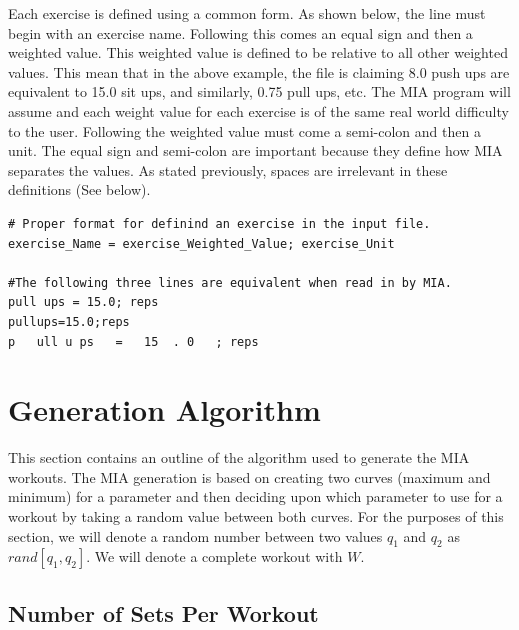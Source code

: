 Each exercise is defined using a common form. As shown below, the line must begin with an exercise name. Following this comes an equal sign and then a weighted value. This weighted value is defined to be relative to all other weighted values. This mean that in the above example, the file is claiming 8.0 push ups are equivalent to 15.0 sit ups, and similarly, 0.75 pull ups, etc. The MIA program will assume and each weight value for each exercise is of the same real world difficulty to the user. Following the weighted value must come a semi-colon and then a unit. The equal sign and semi-colon are important because they define how MIA separates the values. As stated previously, spaces are irrelevant in these definitions (See below).

\begin{lstlisting}
# Proper format for definind an exercise in the input file.
exercise_Name = exercise_Weighted_Value; exercise_Unit

#The following three lines are equivalent when read in by MIA.
pull ups = 15.0; reps
pullups=15.0;reps
p   ull u ps   =   15  . 0   ; reps
\end{lstlisting}


\section{Generation Algorithm}\label{workout algorithm}

This section contains an outline of the algorithm used to generate the MIA workouts. The MIA generation is based on creating two curves (maximum and minimum) for a parameter and then deciding upon which parameter to use for a workout by taking a random value between both curves. For the purposes of this section, we will denote a random number between two values $q_1$ and $q_2$ as $rand[q_1,q_2]$. We will denote a complete workout with $W$.

\subsection{Number of Sets Per Workout}

